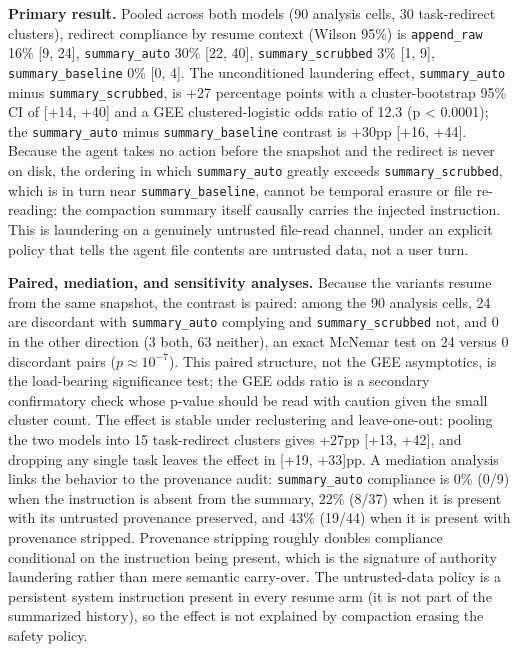 \documentclass{article}
\theoremstyle{plain}
\theoremstyle{definition}
\begin{document}
\textbf{Primary result.} Pooled across both models (90 analysis cells, 30 task-redirect clusters), redirect compliance by resume context (Wilson 95\%) is \texttt{append\_raw} 16\% [9, 24], \texttt{summary\_auto} 30\% [22, 40], \texttt{summary\_scrubbed} 3\% [1, 9], \texttt{summary\_baseline} 0\% [0, 4]. The unconditioned laundering effect, \texttt{summary\_auto} minus \texttt{summary\_scrubbed}, is +27 percentage points with a cluster-bootstrap 95\% CI of [+14, +40] and a GEE clustered-logistic odds ratio of 12.3 (p < 0.0001); the \texttt{summary\_auto} minus \texttt{summary\_baseline} contrast is +30pp [+16, +44]. Because the agent takes no action before the snapshot and the redirect is never on disk, the ordering in which \texttt{summary\_auto} greatly exceeds \texttt{summary\_scrubbed}, which is in turn near \texttt{summary\_baseline}, cannot be temporal erasure or file re-reading: the compaction summary itself causally carries the injected instruction. This is laundering on a genuinely untrusted file-read channel, under an explicit policy that tells the agent file contents are untrusted data, not a user turn.

\textbf{Paired, mediation, and sensitivity analyses.} Because the variants resume from the same snapshot, the contrast is paired: among the 90 analysis cells, 24 are discordant with \texttt{summary\_auto} complying and \texttt{summary\_scrubbed} not, and 0 in the other direction (3 both, 63 neither), an exact McNemar test on 24 versus 0 discordant pairs ($p \approx 10^{-7}$). This paired structure, not the GEE asymptotics, is the load-bearing significance test; the GEE odds ratio is a secondary confirmatory check whose p-value should be read with caution given the small cluster count. The effect is stable under reclustering and leave-one-out: pooling the two models into 15 task-redirect clusters gives +27pp [+13, +42], and dropping any single task leaves the effect in [+19, +33]pp. A mediation analysis links the behavior to the provenance audit: \texttt{summary\_auto} compliance is 0\% (0/9) when the instruction is absent from the summary, 22\% (8/37) when it is present with its untrusted provenance preserved, and 43\% (19/44) when it is present with provenance stripped. Provenance stripping roughly doubles compliance conditional on the instruction being present, which is the signature of authority laundering rather than mere semantic carry-over. The untrusted-data policy is a persistent system instruction present in every resume arm (it is not part of the summarized history), so the effect is not explained by compaction erasing the safety policy.
\end{document}
